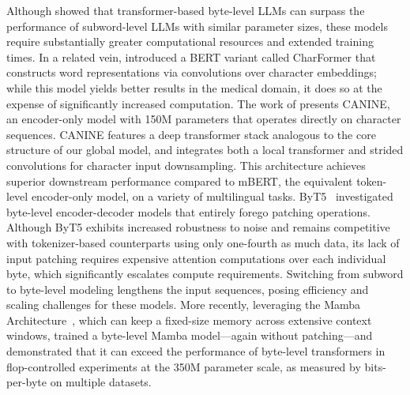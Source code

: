Although \cite{Choe2019BridgingTG} showed that transformer-based byte-level LLMs can surpass the performance of subword-level LLMs with similar parameter sizes, these models require substantially greater computational resources and extended training times. In a related vein, \cite{el2020characterbert} introduced a BERT variant called CharFormer that constructs word representations via convolutions over character embeddings; while this model yields better results in the medical domain, it does so at the expense of significantly increased computation. The work of \cite{clark2022canine} presents CANINE, an encoder-only model with 150M parameters that operates directly on character sequences. CANINE features a deep transformer stack analogous to the core structure of our global model, and integrates both a local transformer and strided convolutions for character input downsampling. This architecture achieves superior downstream performance compared to mBERT, the equivalent token-level encoder-only model, on a variety of multilingual tasks. ByT5~\citep{xue2022byt5} investigated byte-level encoder-decoder models that entirely forego patching operations. Although ByT5 exhibits increased robustness to noise and remains competitive with tokenizer-based counterparts using only one-fourth as much data, its lack of input patching requires expensive attention computations over each individual byte, which significantly escalates compute requirements. Switching from subword to byte-level modeling lengthens the input sequences, posing efficiency and scaling challenges for these models. More recently, leveraging the Mamba Architecture~\citep{gu2023mamba}, which can keep a fixed-size memory across extensive context windows, \cite{wang2024mambabyte} trained a byte-level Mamba model—again without patching—and demonstrated that it can exceed the performance of byte-level transformers in flop-controlled experiments at the 350M parameter scale, as measured by bits-per-byte on multiple datasets.

